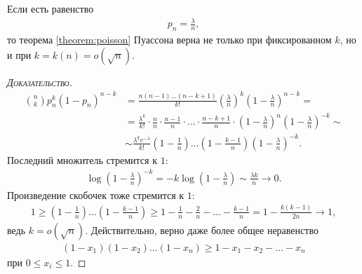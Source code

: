\documentclass[../main.tex]{subfiles}
\begin{document}
\begin{remrk}
 Если есть равенство
 \begin{align*}
  p_n = \frac{\lambda}{n},
 \end{align*} то теорема \ref{theorem:poisson} Пуассона верна не только при фиксированном $ k $, но и при $k = k(n) = o(\sqrt{n})$.
\end{remrk}
\begin{proof}[\normalfont\textsc{Доказательство}]
 \begin{align*}
  \binom n k p_n^{k} (1-p_n)^{n-k} &= \frac{n(n-1)\ldots(n-k+1)}{k!} \left( \frac{\lambda}{n} \right)^{k}\left(1 - \frac{\lambda}{n}\right)^{n-k} = \\
  &=  \frac{\lambda^{k}}{k!} \cdot \frac{n}{n} \cdot \frac{n-1}{n} \cdot \ldots \cdot \frac{n-k+1}{n} \cdot \left( 1 - \frac{\lambda}{n} \right)^{n} \left( 1 - \frac{\lambda}{n} \right)^{-k} \sim \\
  &\sim \frac{\lambda^{k}e^{-\lambda}}{k!} \left( 1 - \frac{1}{n} \right) \ldots \left(1 - \frac{k - 1}{n}\right) \left( 1 - \frac{\lambda}{n} \right)^{-k}
 .\end{align*} Последний множитель стремится к $1$:
 \begin{align*}
  \log \left( 1 - \frac{\lambda}{n} \right)^{-k} = -k \log \left( 1 - \frac{\lambda}{n} \right) \sim \frac{\lambda k}{n} \to 0
 .\end{align*} Произведение скобочек тоже стремится к $1$:
 \begin{align*}
  1 \geqslant \left( 1 - \frac{1}{n} \right) \ldots \left( 1 - \frac{k-1}{n} \right) \geqslant 1 - \frac{1}{n} - \frac{2}{n} - \ldots - \frac{k - 1}{n} = 1- \frac{k(k-1)}{2n} \to 1,
 \end{align*} ведь $ k = o(\sqrt n) $. Действительно, верно даже более общее неравенство
 \begin{align}
  \label{equation:induction_braces_inequality}
  (1-x_1)(1-x_2)\ldots(1-x_n) \geqslant 1 - x_1 - x_2 - \ldots - x_n
 \end{align}  при $0 \leqslant x_i \leqslant 1$.
\end{proof}
\end{document}
